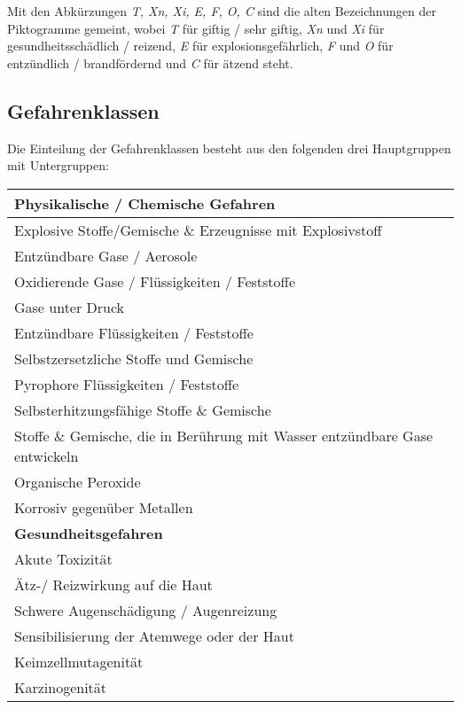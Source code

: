 \noindent
Mit den Abkürzungen \emph{T, Xn, Xi, E, F, O, C} sind die alten Bezeichnungen der Piktogramme 
gemeint, wobei \emph{T} für giftig / sehr giftig, \emph{Xn} und \emph{Xi} für 
gesundheitsschädlich / reizend, \emph{E} für explosionsgefährlich, \emph{F} und \emph{O}
für entzündlich / brandfördernd und \emph{C} für ätzend steht.

\subsection{Gefahrenklassen}

Die Einteilung der Gefahrenklassen besteht aus den folgenden drei Hauptgruppen mit Untergruppen:

\begin{table}[H]
\centering
\begin{tabu} to 1.0\textwidth { | X[l] | } \hline
  \textbf{Physikalische / Chemische Gefahren} \\ [0.5ex] \hline
    Explosive Stoffe/Gemische \& Erzeugnisse mit Explosivstoff \\ \hline
    Entzündbare Gase / Aerosole \\ \hline
    Oxidierende Gase / Flüssigkeiten / Feststoffe \\ \hline
    Gase unter Druck \\ \hline
    Entzündbare Flüssigkeiten / Feststoffe \\ \hline
    Selbstzersetzliche Stoffe und Gemische \\ \hline
    Pyrophore Flüssigkeiten / Feststoffe \\ \hline
    Selbsterhitzungsfähige Stoffe \& Gemische \\ \hline
    Stoffe \& Gemische, die in Berührung mit Wasser entzündbare Gase entwickeln \\ \hline
    Organische Peroxide \\ \hline
    Korrosiv gegenüber Metallen \\ \hline
  \textbf{Gesundheitsgefahren} \\ \hline 
    Akute Toxizität \\ \hline
    Ätz-/ Reizwirkung auf die Haut \\ \hline
    Schwere Augenschädigung / Augenreizung \\ \hline
    Sensibilisierung der Atemwege oder der Haut \\ \hline
    Keimzellmutagenität \\ \hline
    Karzinogenität \\ \hline
\end{tabu}
\end{table}

